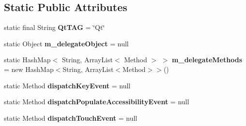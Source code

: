 \subsection*{Static Public Attributes}
\begin{DoxyCompactItemize}
\item 
\mbox{\label{classorg_1_1qtproject_1_1qt5_1_1android_1_1bindings_1_1_qt_application_acf8f3131e19aaef5fc2079bc530f42d6}} 
static final String {\bfseries Qt\+T\+AG} = \char`\"{}Qt\char`\"{}
\item 
\mbox{\label{classorg_1_1qtproject_1_1qt5_1_1android_1_1bindings_1_1_qt_application_a8b778a94cf5468dfc07ae8f3e8d81148}} 
static Object {\bfseries m\+\_\+delegate\+Object} = null
\item 
\mbox{\label{classorg_1_1qtproject_1_1qt5_1_1android_1_1bindings_1_1_qt_application_a5b32c9d8ce150fc1866812b13debbcfb}} 
static Hash\+Map$<$ String, Array\+List$<$ Method $>$ $>$ {\bfseries m\+\_\+delegate\+Methods} = new Hash\+Map$<$String, Array\+List$<$Method$>$$>$()
\item 
\mbox{\label{classorg_1_1qtproject_1_1qt5_1_1android_1_1bindings_1_1_qt_application_a970719713bf7310b041b31dd6415fdcb}} 
static Method {\bfseries dispatch\+Key\+Event} = null
\item 
\mbox{\label{classorg_1_1qtproject_1_1qt5_1_1android_1_1bindings_1_1_qt_application_a263117be3577f4976dc349a550cdb73f}} 
static Method {\bfseries dispatch\+Populate\+Accessibility\+Event} = null
\item 
\mbox{\label{classorg_1_1qtproject_1_1qt5_1_1android_1_1bindings_1_1_qt_application_aa76cf4fe4b2ccebdca957464b7411745}} 
static Method {\bfseries dispatch\+Touch\+Event} = null
\item 
\mbox{\label{classorg_1_1qtproject_1_1qt5_1_1android_1_1bindings_1_1_qt_application_acb66b3d0eafb07d1f13fb0a7ca4262bf}} 
$$
\end{DoxyCompactItemize}
